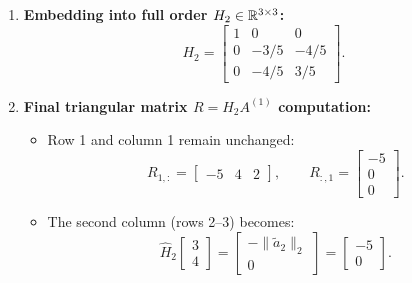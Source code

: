 \begin{example}
\begin{enumerate}
\begin{align}
        &= I_2 - \frac{1}{40} \begin{bmatrix} 64 & 32 \\ 32 & 16 \end{bmatrix} = \begin{bmatrix} 1 & 0 \\ 0 & 1 \end{bmatrix} - \begin{bmatrix} 8/5 & 4/5 \\ 4/5 & 2/5 \end{bmatrix} \nonumber\\
        &= \begin{bmatrix} -3/5 & -4/5 \\ -4/5 & 3/5 \end{bmatrix}.
    \end{align}
    \item \textbf{Embedding into full order $H_2 \in \mathbb{R}^{3 \times 3}$:}
    \begin{equation}
        H_2 = \begin{bmatrix} 
        1 & 0 & 0 \\ 
        0 & -3/5 & -4/5 \\ 
        0 & -4/5 & 3/5 
        \end{bmatrix}.
    \end{equation}
    \item \textbf{Final triangular matrix $R = H_2 A^{(1)}$ computation:}
    \begin{itemize}
        \item Row 1 and column 1 remain unchanged:
        \begin{equation}
            R_{1, :} = \begin{bmatrix} -5 & 4 & 2 \end{bmatrix}, \qquad R_{:, 1} = \begin{bmatrix} -5 \\ 0 \\ 0 \end{bmatrix}.
        \end{equation}
        \item The second column (rows 2--3) becomes:
        \begin{equation}
            \hat{H}_2 \begin{bmatrix} 3 \\ 4 \end{bmatrix} = \begin{bmatrix} -\|\tilde{a}_2\|_2 \\ 0 \end{bmatrix} = \begin{bmatrix} -5 \\ 0 \end{bmatrix}.

\end{equation}
\end{itemize}
\end{enumerate}
\end{example}
